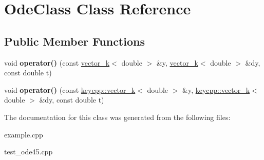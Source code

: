 \hypertarget{class_ode_class}{\section{Ode\-Class Class Reference}
\label{class_ode_class}
}
\subsection*{Public Member Functions}
\begin{DoxyCompactItemize}
\item 
\hypertarget{class_ode_class_a60e726a29e90b8531f8772ab7de04df3}{void {\bfseries operator()} (const \hyperlink{classkeycpp_1_1vector__k}{vector\-\_\-k}$<$ double $>$ \&y, \hyperlink{classkeycpp_1_1vector__k}{vector\-\_\-k}$<$ double $>$ \&dy, const double t)}\label{class_ode_class_a60e726a29e90b8531f8772ab7de04df3}

\item 
\hypertarget{class_ode_class_af12f38cd721ebf26cb84d06a59fd4302}{void {\bfseries operator()} (const \hyperlink{classkeycpp_1_1vector__k}{keycpp\-::vector\-\_\-k}$<$ double $>$ \&y, \hyperlink{classkeycpp_1_1vector__k}{keycpp\-::vector\-\_\-k}$<$ double $>$ \&dy, const double t)}\label{class_ode_class_af12f38cd721ebf26cb84d06a59fd4302}

\end{DoxyCompactItemize}


The documentation for this class was generated from the following files\-:\begin{DoxyCompactItemize}
\item 
example.\-cpp\item 
test\-\_\-ode45.\-cpp\end{DoxyCompactItemize}
